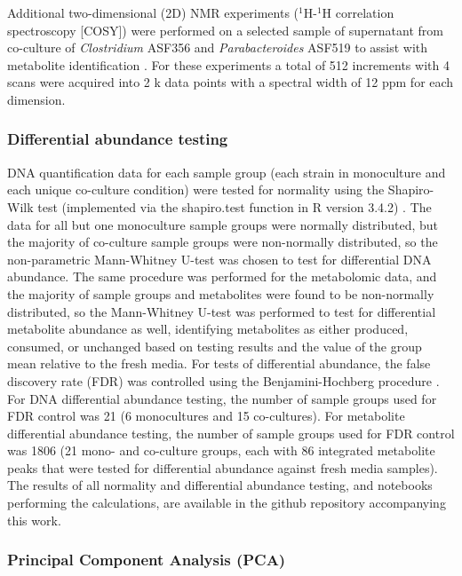 \documentclass[11pt,onecolumn,notitlepage,openany,twoside]{book}
\begin{document}
\begin{refsection}
Additional two-dimensional (2D) NMR experiments ($^1\!$H-$^1\!$H correlation spectroscopy [COSY]) were performed on a selected sample of supernatant from co-culture of \textit{Clostridium} ASF356 and \textit{Parabacteroides} ASF519 to assist with metabolite identification \cite{Beckonert2007-cj}. For these experiments a total of 512 increments with 4 scans were acquired into 2 k data points with a spectral width of 12 ppm for each dimension.

\subsubsection{Differential abundance testing}

DNA quantification data for each sample group (each strain in monoculture and each unique co-culture condition) were tested for normality using the Shapiro-Wilk test (implemented via the shapiro.test function in R version 3.4.2) \cite{Royston1982-mm}. The data for all but one monoculture sample groups were normally distributed, but the majority of co-culture sample groups were non-normally distributed, so the non-parametric Mann-Whitney U-test was chosen to test for differential DNA abundance. The same procedure was performed for the metabolomic data, and the majority of sample groups and metabolites were found to be non-normally distributed, so the Mann-Whitney U-test was performed to test for differential metabolite abundance as well, identifying metabolites as either produced, consumed, or unchanged based on testing results and the value of the group mean relative to the fresh media. For tests of differential abundance, the false discovery rate (FDR) was controlled using the Benjamini-Hochberg procedure \cite{Benjamini1995-nd}. For DNA differential abundance testing, the number of sample groups used for FDR control was 21 (6 monocultures and 15 co-cultures). For metabolite differential abundance testing, the number of sample groups used for FDR control was 1806 (21 mono- and co-culture groups, each with 86 integrated metabolite peaks that were tested for differential abundance against fresh media samples). The results of all normality and differential abundance testing, and notebooks performing the calculations, are available in the github repository accompanying this work.

\subsubsection{Principal Component Analysis (PCA)}


\end{refsection}
\end{document}

